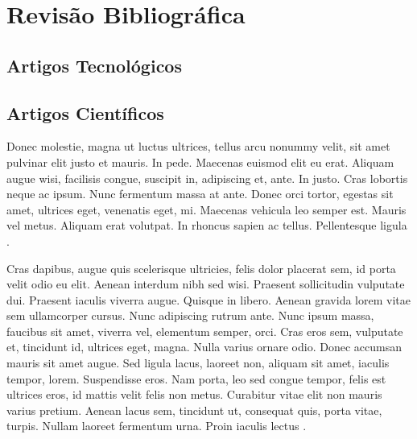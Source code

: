 

\chapter{Revisão Bibliográfica}
\label{chap:Revisão-Bibliográfica}

\lipsum[15]

\section{Artigos Tecnológicos}
\label{sec:Artigos-Tecnológicos}

\lipsum[16-20]


\section{Artigos Científicos}
\label{sec:Artigos-Científicos}

Donec molestie, magna ut luctus ultrices, tellus arcu nonummy velit, sit
amet pulvinar elit justo et mauris. In pede. Maecenas euismod elit eu erat.
Aliquam augue wisi, facilisis congue, suscipit in, adipiscing et, ante. In justo.
Cras lobortis neque ac ipsum. Nunc fermentum massa at ante. Donec orci
tortor, egestas sit amet, ultrices eget, venenatis eget, mi. Maecenas vehicula
leo semper est. Mauris vel metus. Aliquam erat volutpat. In rhoncus sapien ac
tellus. Pellentesque ligula \cite{biot1957}.

Cras dapibus, augue quis scelerisque ultricies, felis dolor placerat sem, id
porta velit odio eu elit. Aenean interdum nibh sed wisi. Praesent sollicitudin
vulputate dui. Praesent iaculis viverra augue. Quisque in libero. Aenean
gravida lorem vitae sem ullamcorper cursus. Nunc adipiscing rutrum ante.
Nunc ipsum massa, faucibus sit amet, viverra vel, elementum semper, orci.
Cras eros sem, vulputate et, tincidunt id, ultrices eget, magna. Nulla varius
ornare odio. Donec accumsan mauris sit amet augue. Sed ligula lacus, laoreet
non, aliquam sit amet, iaculis tempor, lorem. Suspendisse eros. Nam porta,
leo sed congue tempor, felis est ultrices eros, id mattis velit felis non metus.
Curabitur vitae elit non mauris varius pretium. Aenean lacus sem, tincidunt
ut, consequat quis, porta vitae, turpis. Nullam laoreet fermentum urna. Proin
iaculis lectus \cite{terzaghi1943}.

